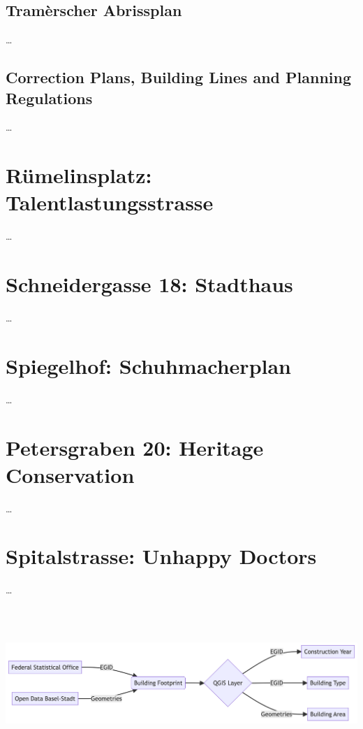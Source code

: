 \documentclass[
  letterpaper,
  DIV=11,
  numbers=noendperiod]{scrartcl}
\begin{document}
\subsection{Tramèrscher Abrissplan}\label{tramuxe8rscher-abrissplan}

\ldots{}

\subsection{Correction Plans, Building Lines and Planning
Regulations}\label{correction-plans-building-lines-and-planning-regulations}

\ldots{}

\section{Rümelinsplatz:
Talentlastungsstrasse}\label{ruxfcmelinsplatz-talentlastungsstrasse}

\ldots{}

\section{Schneidergasse 18:
Stadthaus}\label{schneidergasse-18-stadthaus}

\ldots{}

\section{Spiegelhof: Schuhmacherplan}\label{spiegelhof-schuhmacherplan}

\ldots{}

\section{Petersgraben 20: Heritage
Conservation}\label{petersgraben-20-heritage-conservation}

\ldots{}

\section{Spitalstrasse: Unhappy
Doctors}\label{spitalstrasse-unhappy-doctors}

\ldots{}

\includegraphics[width=9.76in,height=2.27in]{palimpsest-bs_files/figure-latex/mermaid-figure-1.png}
\end{document}
